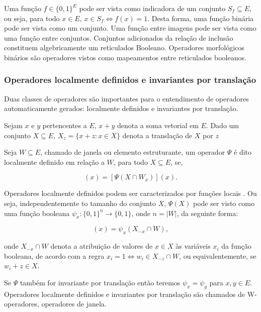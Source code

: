 \documentclass[a4paper,11pt]{article}
\begin{document}
    Uma função $f \in \{ 0, 1 \}^E$ pode ser vista como indicadora de um conjunto $S_f \subseteq E$, ou seja, para todo $x \in E$, $x \in S_f \Leftrightarrow f(x) = 1$. Desta forma, uma função binária pode ser vista como um conjunto. Uma função entre imagens pode ser vista como uma função entre conjuntos. Conjuntos adicionados da relação de inclusão constituem algebricamente um reticulados Booleano. Operadores morfológicos binários são operadores vistos como mapeamentos entre reticulados booleanos.

  \subsubsection{Operadores localmente definidos e invariantes por translação}

    Duas classes de operadores são importantes para o entendimento de operadores automaticamente gerados: localmente definidos e invariantes por translação.

    Sejam $x$ e $y$ pertencentes a $E$, $x + y$ denota a soma vetorial em $E$. Dado um conjunto $X \subseteq E$, $X_z = \{ x + z \colon x \in X \}$ denota a translação de $X$ por $z$

    Seja $W \subseteq E$, chamado de janela ou elemento estruturante, um operador $\Psi$ é dito localmente definido em relação a $W$, para todo $X \subseteq E$, se,

    \begin{equation}
      [\Psi(X)](x) = [\Psi(X \cap W_x)](x).
    \end{equation}

    Operadores localmente definidos podem ser caracterizados por funções locais \cite{Tomita:1996:PrAuMa}. Ou seja, independentemente to tamanho do conjunto $X$, $\Psi(X)$ pode ser visto como uma função booleana $\psi_x \colon \{0, 1\}^n \rightarrow \{0, 1\}$, onde $n = |W|$, da seguinte forma:

    \begin{equation}
      [\Psi(X)](x) = \psi_x(X_{-x} \cap W),
    \end{equation}

    onde $X_{-x} \cap W$ denota a atribuição de valores de $x \in X$ às variáveis $x_i$ da função booleana, de acordo com a regra $x_i = 1 \Leftrightarrow w_i \in X_{-z} \cap W$, ou equivalentemente, se $w_i + z \in X$.

    Se $\Psi$ também for invariante por translação então teremos $\psi_x = \psi_y$ para $x, y \in E$. Operadores localmente definidos e invariantes por translação são chamados de W-operadores, operadores de janela.
\end{document}
